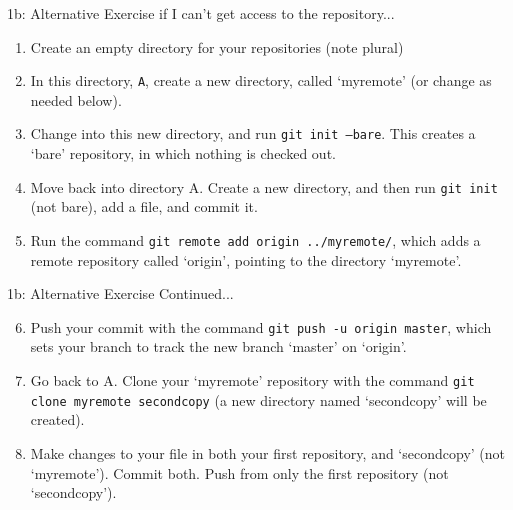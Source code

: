 \documentclass{beamer}
\begin{document}
\begin{frame}
  \begin{block}{1b: Alternative Exercise if I can\rq{}t get access to the repository...}
    \begin{enumerate}
      \item Create an empty directory for your repositories (note plural)
      \item In this directory, \texttt{A}, create a new directory, called \lq{}myremote\rq{} (or change as needed below).
      \item Change into this new directory, and run \texttt{git init --bare}. This creates a \lq{}bare\rq{} repository, in which nothing is checked out.
      \item Move back into directory A. Create a new directory, and then run \texttt{git init} (not bare), add a file, and commit it.
      \item Run the command \texttt{git remote add origin ../myremote/}, which adds a remote repository called \lq{}origin\rq{}, pointing to the directory \lq{}myremote\rq{}.
    \end{enumerate}
  \end{block}
\end{frame}
\begin{frame}
  \begin{block}{1b: Alternative Exercise Continued...}
    \begin{enumerate}
      \setcounter{enumi}{5} %
      \item Push your commit with the command \texttt{git push -u origin master}, which sets your branch to track the new branch \lq{}master\rq{} on \lq{}origin\rq{}.
      \item Go back to A. Clone your \lq{}myremote\rq{} repository with the command \texttt{git clone myremote secondcopy} (a new directory named \lq{}secondcopy\rq{} will be created).
      \item Make changes to your file in both your first repository, and \lq{}secondcopy\rq{} (not \lq{}myremote\rq{}). Commit both. Push from only the first repository (not \lq{}secondcopy\rq{}).
    \end{enumerate}
  \end{block}
\end{frame}
\end{document}
